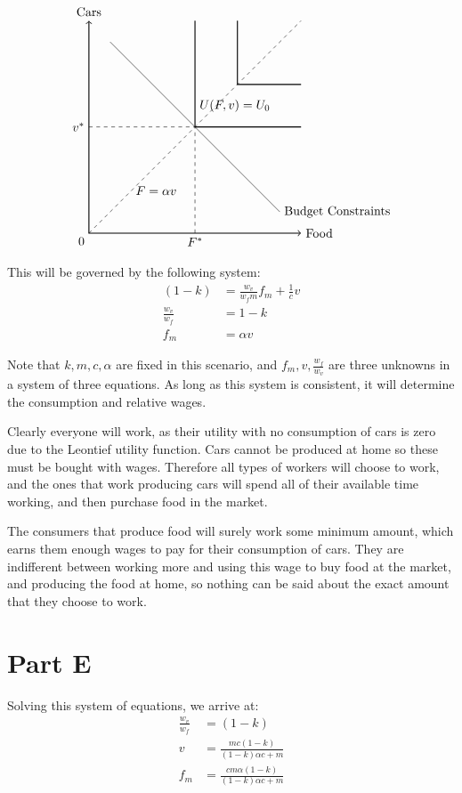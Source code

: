 \documentclass[12pt]{paper}
\begin{document}
$$\begin{tikzpicture}[scale=0.6]

\draw[thick,<->] (0,10) node[above]{Cars}--(0,0)--(10,0) node[right]{Food};

\node [below left] at (0,0) {$0$};

\draw[dashed] (0,5)--(5,5);
\draw[dashed] (5,0)--(5,5);
\node [below] at (5,0) {$F^{*}$};
\node [left] at (0,5) {$v^{*}$};

\draw(1,9)--(9,1) node[right]{Budget Constraints};
\draw[thick](5,10)--(5,6)node[right]{$U(F,v)=U_0$}--(5,5)--(10,5);
\draw[thick](7,10)--(7,8)node[right]{}--(7,7)--(10,7);

\draw[dashed](0,0)--(2,2)node[right]{$F = \alpha v$}--(10,10);

\end{tikzpicture}$$

This will be governed by the following system:
\begin{align*}
  (1-k) &= \frac{w_v}{w_f m} f_m + \frac{1}{c} v\\
  \frac{w_v}{w_f} &= 1-k\\
  f_m &= \alpha v
\end{align*}

Note that $k, m, c, \alpha$ are fixed in this scenario, and
$f_m,v, \frac{w_f}{w_v}$ are three unknowns in a system of three
equations. As long as this system is consistent, it will determine the
consumption and relative wages.

Clearly everyone will work, as their utility with no consumption of
cars is zero due to the Leontief utility function. Cars cannot be
produced at home so these must be bought with wages. Therefore all
types of workers will choose to work, and the ones that work producing
cars will spend all of their available time working, and then purchase
food in the market.

The consumers that produce food will surely work some minimum amount, which
earns them enough wages to pay for their consumption of cars. They are
indifferent between working more and using this wage to buy food at
the market, and producing the food at home, so nothing can be said
about the exact amount that they choose to work.

\section*{Part E}
Solving this system of equations, we arrive at:
\begin{align*}
  \frac{w_v}{w_f} &= (1-k)\\
  v &= \frac{m c (1-k)}{(1-k)\alpha c + m}\\
  f_m &= \frac{c m \alpha (1-k)}{(1-k) \alpha c + m}
\end{align*}
\end{document}
